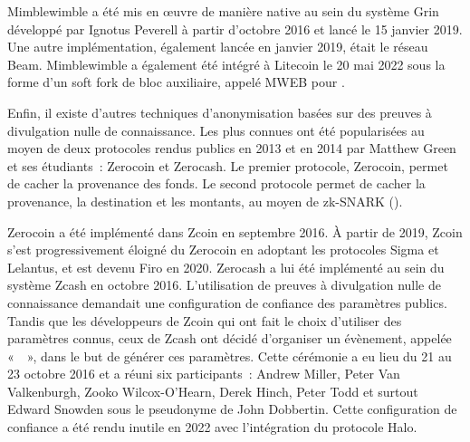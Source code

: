 Mimblewimble a été mis en œuvre de manière native au sein du système Grin développé par Ignotus Peverell à partir d'octobre 2016 et lancé le 15 janvier 2019. Une autre implémentation, également lancée en janvier 2019, était le réseau Beam. Mimblewimble a également été intégré à Litecoin le 20 mai 2022 sous la forme d'un soft fork de bloc auxiliaire, appelé MWEB pour . %


Enfin, il existe d'autres techniques d'anonymisation basées sur des preuves à divulgation nulle de connaissance. Les plus connues ont été popularisées au moyen de deux protocoles rendus publics en 2013 et en 2014 par Matthew Green et ses étudiants~: Zerocoin et Zerocash. Le premier protocole, Zerocoin, permet de cacher la provenance des fonds. Le second protocole permet de cacher la provenance, la destination et les montants, au moyen de zk-SNARK ().

Zerocoin a été implémenté dans Zcoin en septembre 2016. À partir de 2019, Zcoin s'est progressivement éloigné du Zerocoin en adoptant les protocoles Sigma et Lelantus, et est devenu Firo en 2020. Zerocash a lui été implémenté au sein du système Zcash en octobre 2016. L'utilisation de preuves à divulgation nulle de connaissance demandait une configuration de confiance des paramètres publics. Tandis que les développeurs de Zcoin qui ont fait le choix d'utiliser des paramètres connus, ceux de Zcash ont décidé d'organiser un évènement, appelée «~~», dans le but de générer ces paramètres. Cette cérémonie a eu lieu du 21 au 23 octobre 2016 et a réuni six participants~: Andrew Miller, Peter Van Valkenburgh, Zooko Wilcox-O'Hearn, Derek Hinch, Peter Todd et surtout Edward Snowden sous le pseudonyme de John Dobbertin. Cette configuration de confiance a été rendu inutile en 2022 avec l'intégration du protocole Halo.

